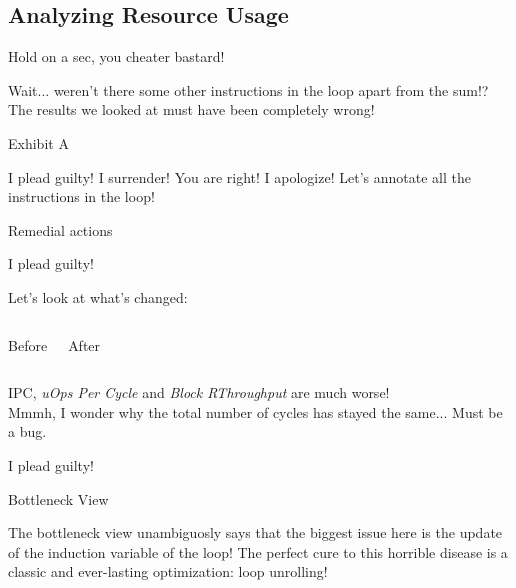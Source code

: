 
\subsection{Analyzing Resource Usage}


\begin{frame}{Hold on a sec, you cheater bastard!}
\begin{overprint}
Wait... weren't there \alert{some other instructions in the loop} apart from the sum!?
The results we looked at must have been completely wrong!
\end{overprint}
\begin{block}{Exhibit A}
\end{block}
\end{frame}


\begin{frame}{I plead guilty!}
I surrender! You are right! I apologize! Let's annotate all the instructions in the loop!
\begin{block}{Remedial actions}
\end{block}
\end{frame}


\begin{frame}{I plead guilty!}
\begin{center}
Let's look at what's changed:
%
\begin{columns}

\begin{block}{Before}
\end{block}

\begin{block}{After}
\end{block}

\end{columns}
\medskip
IPC, \emph{uOps Per Cycle} and \emph{Block RThroughput} are much worse!\\
\medskip
{\footnotesize Mmmh, I wonder why the total number of cycles has stayed the same... Must be a bug.}
\end{center}
\end{frame}


\begin{frame}{I plead guilty!}
\begin{center}
\begin{block}{Bottleneck View}
\txtinput[\tt\fontsize{5.7pt}{6pt}\selectfont]{listings/01_add_reduction_v1b_p04.txt}
\end{block}
\medskip
\begin{overprint}
The bottleneck view unambiguosly says that the biggest issue here is the update of the induction variable of the loop!
The perfect cure to this horrible disease is a classic and ever-lasting optimization: \alert{loop unrolling}!
\end{overprint}
\end{center}
\end{frame}


